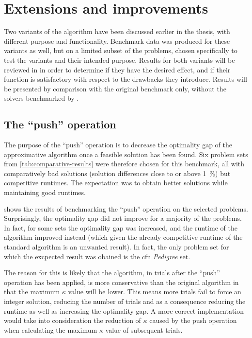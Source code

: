\section{Extensions and improvements}
Two variants of the algorithm have been discussed earlier in the thesis, with different purpose and functionality.
Benchmark data was produced for these variants as well, but on a limited subset of the problems, chosen specifically to test the variants and their intended purpose.
Results for both variants will be reviewed in in order to determine if they have the desired effect, and if their function is satisfactory with respect to the drawbacks they introduce.
Results will be presented by comparison with the original benchmark only, without the solvers benchmarked by \textcite{deGivry14}.


\subsection{The \enquote{push} operation}
The purpose of the \enquote{push} operation is to decrease the optimality gap of the approximative algorithm once a feasible solution has been found.
Six problem sets from \cref{tab:comparative-results} were therefore chosen for this benchmark, all with comparatively bad solutions (solution differences close to or above \SI{1}{\percent}) but competitive runtimes.
The expectation was to obtain better solutions while maintaining good runtimes.

 shows the results of benchmarking the \enquote{push} operation on the selected problems.
Surprisingly, the optimality gap did not improve for a majority of the problems.
In fact, for some sets the optimality gap was increased, and the runtime of the algorithm improved instead (which given the already competitive runtime of the standard algorithm is an unwanted result).
In fact, the only problem set for which the excpected result was obained is the \gls{cfn} \emph{Pedigree} set.

The reason for this is likely that the algorithm, in trials after the \enquote{push} operation has been applied, is more conservative than the original algorithm in that the maximum \(\kappa\) value will be lower. This means more trials fail to force an integer solution, reducing the number of trials and as a consequence reducing the runtime as well as increasing the optimality gap.
A more correct implementation would take into consideration the reduction of \(\kappa\) caused by the push operation when calculating the maximum \(\kappa\) value of subsequent trials.

